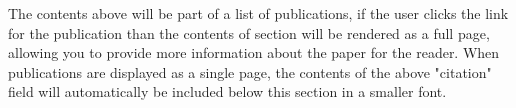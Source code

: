 The contents above will be part of a list of publications, if the user clicks the link for the publication than the contents of section will be rendered as a full page, allowing you to provide more information about the paper for the reader. When publications are displayed as a single page, the contents of the above "citation" field will automatically be included below this section in a smaller font.